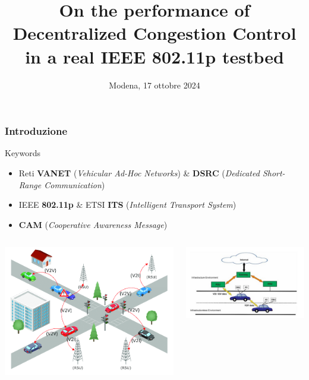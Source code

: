 \documentclass{beamer}
\title[DCC performance in IEEE 802.11p] %
{On the performance of Decentralized Congestion Control in a real IEEE 802.11p testbed}
\institute[] %
{
    \fontsize{11}{13}\selectfont \textbf{Relatore: Prof. Carlo Augusto Grazia}
    \and
    Esame di Automotive Connectivity\\
    Corso di Laurea Magistrale in Ingegneria Informatica\\
    Percorso "\textit{Cloud \& Cybersecurity}"
    \and
    Dipartimento di Ingegneria "Enzo Ferrari"\\
    Università degli studi di Modena e Reggio Emilia
}
\date[17 ottobre 2024] %
{Modena, 17 ottobre 2024}
\begin{document}
\frame{\titlepage}

\begin{frame}
    \frametitle{Introduzione}
    \centering
    \begin{block}{Keywords}
        \begin{itemize}
            \item Reti \textbf{VANET} (\textit{Vehicular Ad-Hoc Networks}) \& \textbf{DSRC} (\textit{Dedicated Short-Range Communication})
            \item IEEE \textbf{802.11p} \& ETSI \textbf{ITS} (\textit{Intelligent Transport System})
            \item \textbf{CAM} (\textit{Cooperative Awareness Message})
        \end{itemize}
    \end{block}
    
    \begin{columns}
        \begin{column}{0.5\textwidth}
            \centering
            \includegraphics[width=1\textwidth]{vanet.png}
            \label{fig:vanet}
        \end{column}
        \begin{column}{0.5\textwidth}
            \centering
            \includegraphics[width=1\textwidth]{routing_vanet.jpeg}
            \label{fig:obu_rsu}
        \end{column}
    \end{columns}
\end{frame}    
\end{document}
